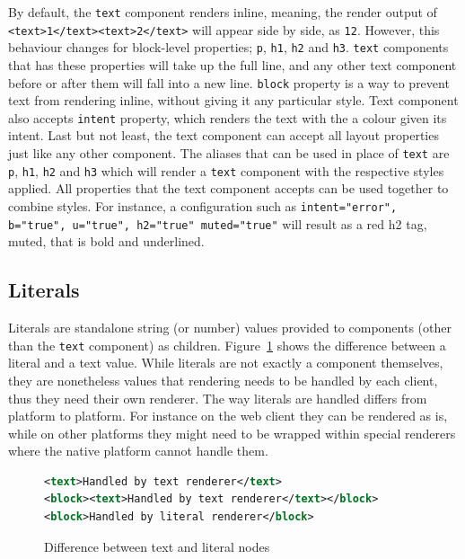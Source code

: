 By default, the \texttt{text} component renders inline, meaning, the render output of \texttt{<text>1</text><text>2</text>} will appear side by side, as \texttt{12}. However, this behaviour changes for block-level properties; \texttt{p}, \texttt{h1}, \texttt{h2} and \texttt{h3}. \texttt{text} components that has these properties will take up the full line, and any other text component before or after them will fall into a new line. \texttt{block} property is a way to prevent text from rendering inline, without giving it any particular style. Text component also accepts \texttt{intent} property, which renders the text with the a colour given its intent. Last but not least, the text component can accept all layout properties just like any other component. The aliases that can be used in place of \texttt{text} are \texttt{p}, \texttt{h1}, \texttt{h2} and \texttt{h3} which will render a \texttt{text} component with the respective styles applied. All properties that the text component accepts can be used together to combine styles. For instance, a configuration such as \texttt{intent="error", b="true", u="true", h2="true" muted="true"} will result as a red h2 tag, muted, that is bold and underlined.

\subsection{Literals}

Literals are standalone string (or number) values provided to components (other than the \texttt{text} component) as children. Figure~\ref{fig:text_vs_literal} shows the difference between a literal and a text value. While literals are not exactly a component themselves, they are nonetheless values that rendering needs to be handled by each client, thus they need their own renderer. The way literals are handled differs from platform to platform. For instance on the web client they can be rendered as is, while on other platforms they might need to be wrapped within special renderers where the native platform cannot handle them.

\begin{figure}[htb]
\begin{minipage}{\linewidth}
\begin{lstlisting}[language=xml]
<text>Handled by text renderer</text>
<block><text>Handled by text renderer</text></block>
<block>Handled by literal renderer</block>
\end{lstlisting}
\end{minipage}
\caption{Difference between text and literal nodes}%
\label{fig:text_vs_literal}%
\end{figure}

